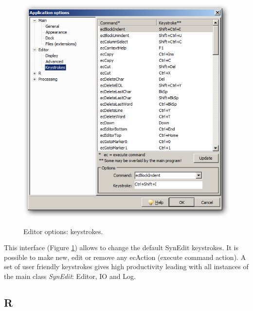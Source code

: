 \begin{figure}[h!]
  \includegraphics[scale=0.50]{./res/app_editor_keystrokes.png}\\
  \caption{Editor options: keystrokes.}
  \label{fig:editor_keystrokes}
\end{figure}

This interface
(Figure \ref{fig:editor_keystrokes})
allows to change the default SynEdit keystrokes.
It is possible to make new, edit or remove any ecAction (execute command action).
A set of user friendly keystrokes gives high productivity leading with
all instances of the main class \textit{SynEdit}: Editor, IO and Log.


\hypertarget{working_app_r}{}
\subsection{R}

